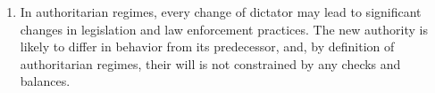 \documentclass[11pt]{article}
\theoremstyle{remark}
\theoremstyle{definition}
\begin{document}
\begin{enumerate}






\item In authoritarian regimes, every change of dictator may lead to significant changes in legislation and law enforcement practices. The new authority is likely to differ in behavior from its predecessor, and, by definition of authoritarian regimes, their will is not constrained by any checks and balances.












\end{enumerate}
\end{document}
